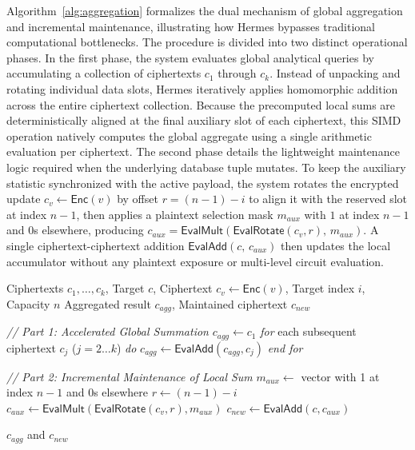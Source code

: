 \documentclass[sigconf,nonacm]{acmart}
\begin{document}
Algorithm~\ref{alg:aggregation} formalizes the dual mechanism of global aggregation and incremental maintenance, illustrating how Hermes bypasses traditional computational bottlenecks. The procedure is divided into two distinct operational phases. In the first phase, the system evaluates global analytical queries by accumulating a collection of ciphertexts $c_1$ through $c_k$. Instead of unpacking and rotating individual data slots, Hermes iteratively applies homomorphic addition across the entire ciphertext collection. Because the precomputed local sums are deterministically aligned at the final auxiliary slot of each ciphertext, this SIMD operation natively computes the global aggregate using a single arithmetic evaluation per ciphertext. 
The second phase details the lightweight maintenance logic required when the underlying database tuple mutates.
To keep the auxiliary statistic synchronized with the active payload,
the system rotates the encrypted update $c_v \leftarrow \mathsf{Enc}(v)$ by offset $r = (n-1) - i$ to align it with the reserved slot at index $n-1$,
then applies a plaintext selection mask $m_{\mathit{aux}}$ with $1$ at index $n-1$ and $0$s elsewhere, 
producing $c_{\mathit{aux}} = \mathsf{EvalMult}(\mathsf{EvalRotate}(c_v, r),\, m_{\mathit{aux}})$.
A single ciphertext-ciphertext addition $\mathsf{EvalAdd}(c,\, c_{\mathit{aux}})$ then updates the local accumulator without any plaintext exposure or multi-level circuit evaluation.

\begin{algorithm}[t]
\caption{Homomorphic Aggregate and Maintenance}
\label{alg:aggregation}
\begin{algorithmic}[1]
\Require Ciphertexts $c_1, \dots, c_k$, Target $c$, Ciphertext $c_v \gets \mathsf{Enc}(v)$, Target index $i$, Capacity $n$
\Ensure Aggregated result $c_{agg}$, Maintained ciphertext $c_{new}$

\Statex \textit{// Part 1: Accelerated Global Summation}
\State $c_{agg} \gets c_1$
\State \textit{for} each subsequent ciphertext $c_j$ ($j=2 \dots k$) \textit{do}
\State \hspace{1em} $c_{agg} \gets \mathsf{EvalAdd}(c_{agg}, c_j)$ 
\State \textit{end for}

\Statex \textit{// Part 2: Incremental Maintenance of Local Sum}
\State $m_{aux} \gets$ vector with 1 at index $n-1$ and 0s elsewhere
\State $r \gets (n-1) - i$ 
\State $c_{aux} \gets \mathsf{EvalMult}(\mathsf{EvalRotate}(c_v, r), m_{aux})$
\State $c_{new} \gets \mathsf{EvalAdd}(c, c_{aux})$ 

\State \Return $c_{agg}$ and $c_{new}$
\end{algorithmic}
\end{algorithm}
\end{document}
